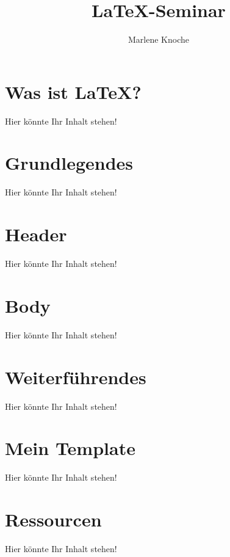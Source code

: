 \documentclass{beamer}
\author{Marlene Knoche}
\title{\LaTeX-Seminar}
\begin{document}
\begin{frame}

\maketitle

\end{frame}

\begin{frame}

\tableofcontents

\end{frame}

\section{Was ist \LaTeX?}

\begin{frame}
Hier könnte Ihr Inhalt stehen!
\end{frame}

\section{Grundlegendes}
\begin{frame}
Hier könnte Ihr Inhalt stehen!
\end{frame}

\section{Header}
\begin{frame}
Hier könnte Ihr Inhalt stehen!
\end{frame}

\section{Body}
\begin{frame}
Hier könnte Ihr Inhalt stehen!
\end{frame}

\section{Weiterführendes}
\begin{frame}
Hier könnte Ihr Inhalt stehen!
\end{frame}

\section{Mein Template}
\begin{frame}
Hier könnte Ihr Inhalt stehen!
\end{frame}

\section{Ressourcen}
\begin{frame}
Hier könnte Ihr Inhalt stehen!
\end{frame}
\end{document}
